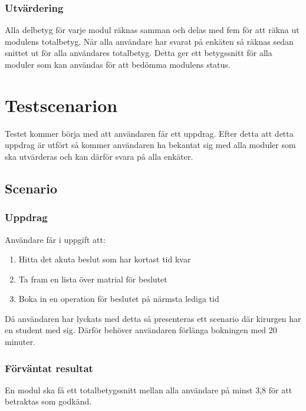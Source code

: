 \documentclass[a4paper,10pt, twoside]{article}
\begin{document}
\subsubsection{Utvärdering}
Alla delbetyg för varje modul räknas samman och delas med fem för att räkna ut modulens totalbetyg.
När alla användare har svarat på enkäten så räknas sedan snittet ut för alla användares totalbetyg. Detta ger ett betygssnitt för alla moduler som kan användas för att bedömma modulens status.
\section{Testscenarion}
Testet kommer börja med att användaren får ett uppdrag. Efter detta att detta uppdrag är utfört så kommer användaren ha bekantat sig med alla moduler som ska utvärderas och kan därför svara på alla enkäter. 
\subsection{Scenario}
\subsubsection{Uppdrag}
Användare får i uppgift att:
\begin{enumerate}
	\item Hitta det akuta beslut som har kortast tid kvar
	\item Ta fram en lista över matrial för beslutet
	\item Boka in en operation för beslutet på närmsta lediga tid
\end{enumerate}
Då användaren har lyckats med detta så presenteras ett scenario där kirurgen har en student med sig. Därför behöver användaren förlänga bokningen med 20 minuter.
\subsubsection{Förväntat resultat}
En modul ska få ett totalbetygssnitt mellan alla användare på minst 3,8 för att betraktas som godkänd.
\end{document}

